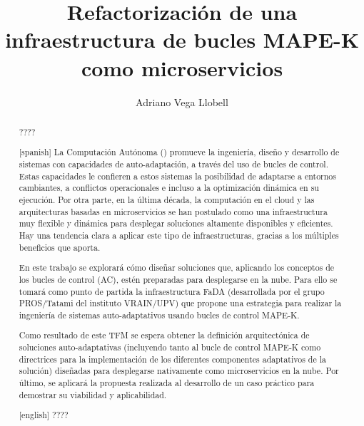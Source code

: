 \documentclass[11pt,spanish,listoffigures,listoftables,listofalgorithms]{\relativepath/tfgetsinf}
\title{Refactorización de una infraestructura de bucles MAPE-K como microservicios}
\author{Adriano Vega Llobell}
\begin{document}



\begin{abstract}
????
\end{abstract}
\begin{abstract}[spanish]
  La Computación Autónoma () promueve la ingeniería, diseño y desarrollo de sistemas con capacidades de auto-adaptación, a través del uso de bucles de control. Estas capacidades le confieren a estos sistemas la posibilidad de adaptarse a entornos cambiantes, a conflictos operacionales e incluso a la optimización dinámica en su ejecución. Por otra parte, en la última década, la computación en el cloud y las arquitecturas basadas en microservicios se han postulado como una infraestructura muy flexible y dinámica para desplegar soluciones altamente disponibles y eficientes. Hay una tendencia clara a aplicar este tipo de infraestructuras, gracias a los múltiples beneficios que aporta.

  En este trabajo se explorará cómo diseñar soluciones que, aplicando los conceptos de los bucles de control (AC), estén preparadas para desplegarse en la nube. Para ello se tomará como punto de partida la infraestructura FaDA (desarrollada por el grupo PROS/Tatami del instituto VRAIN/UPV) que propone una estrategia para realizar la ingeniería de sistemas auto-adaptativos usando bucles de control MAPE-K.

  Como resultado de este TFM se espera obtener la definición arquitectónica de soluciones auto-adaptativas (incluyendo tanto al bucle de control MAPE-K como directrices para la implementación de los diferentes componentes adaptativos de la solución) diseñadas para desplegarse nativamente como microservicios en la nube. Por último, se aplicará la propuesta realizada al desarrollo de un caso práctico para demostrar su viabilidad y aplicabilidad.
\end{abstract}
\begin{abstract}[english]
????
\end{abstract}

\end{document}
